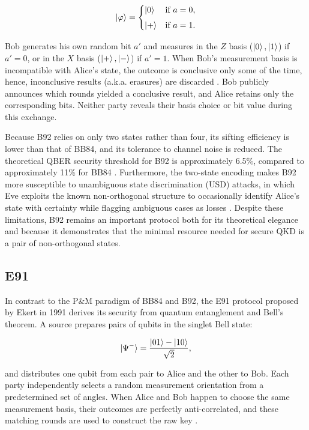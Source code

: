 \documentclass[10pt, a4paper]{report}
\begin{document}
%
\begin{equation}
  \ket{\varphi} =
  \begin{cases}
    \ket{0}  & \text{if } a = 0, \\[4pt]
    \ket{+}  & \text{if } a = 1.
  \end{cases}
  \label{eq:b92-states}
\end{equation}
%

Bob generates his own random bit $a'$ and measures in the $Z$ basis ($\ket{0},\ket{1}$) if $a' = 0$, or in the $X$ basis ($\ket{+},\ket{-}$) if $a' = 1$. When Bob's measurement basis is incompatible with Alice's state, the outcome is conclusive only some of the time, hence, inconclusive results (a.k.a. erasures) are discarded \cite{QKDbible}. Bob publicly announces which rounds yielded a conclusive result, and Alice retains only the corresponding bits. Neither party reveals their basis choice or bit value during this exchange.

Because B92 relies on only two states rather than four, its sifting efficiency is lower than that of BB84, and its tolerance to channel noise is reduced. The theoretical QBER security threshold for B92 is approximately 6.5\%, compared to approximately 11\% for BB84 \cite{ekertQI}. Furthermore, the two-state encoding makes B92 more susceptible to unambiguous state discrimination (USD) attacks, in which Eve exploits the known non-orthogonal structure to occasionally identify Alice's state with certainty while flagging ambiguous cases as losses \cite{B92}. Despite these limitations, B92 remains an important protocol both for its theoretical elegance and because it demonstrates that the minimal resource needed for secure QKD is a pair of non-orthogonal states.

\subsection{E91}
\label{sec:e91}

In contrast to the P\&M paradigm of BB84 and B92, the E91 protocol proposed by Ekert in 1991 \cite{E91} derives its security from quantum entanglement and Bell's theorem. A source prepares pairs of qubits in the singlet Bell state:

%
\begin{equation}
  \ket{\Psi^{-}} = \frac{\ket{01} - \ket{10}}{\sqrt{2}},
  \label{eq:e91-singlet}
\end{equation}
%

and distributes one qubit from each pair to Alice and the other to Bob. Each party independently selects a random measurement orientation from a predetermined set of angles. When Alice and Bob happen to choose the same measurement basis, their outcomes are perfectly anti-correlated, and these matching rounds are used to construct the raw key \cite{E91}.
\end{document}

